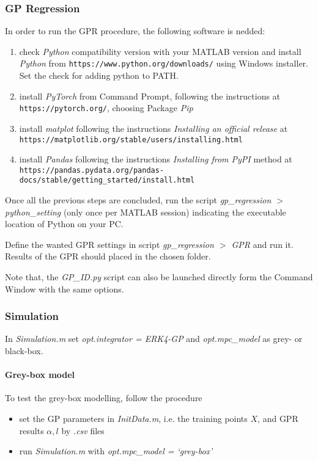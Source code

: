 \documentclass{article}
\begin{document}
\subsubsection{GP Regression}

In order to run the GPR procedure, the following software is nedded:
\begin{enumerate}
    \item check \textit{Python} compatibility version with your MATLAB version and install \textit{Python} from \texttt{https://www.python.org/downloads/} using Windows installer. Set the check for adding python to PATH.%
    \item install \textit{PyTorch} from Command Prompt, following the instructions at \texttt{https://pytorch.org/}, choosing Package \textit{Pip}
    \item install \textit{matplot} following the instructions \textit{Installing an official release} at\\ \texttt{https://matplotlib.org/stable/users/installing.html}
    \item install \textit{Pandas} following the instructions \textit{Installing from PyPI} method at\\ \texttt{https://pandas.pydata.org/pandas-docs/stable/getting\_started/install.html}
\end{enumerate}

Once all the previous steps are concluded, run the script \textit{gp\_regression $>$ python\_setting} (only once per MATLAB session) indicating the executable location of Python on your PC.

Define the wanted GPR settings in script \textit{gp\_regression $>$ GPR} and run it. Results of the GPR should placed in the chosen folder. 

Note that, the \textit{GP\_ID.py} script can also be launched directly form the Command Window with the same options.

\subsubsection{Simulation}

In \textit{Simulation.m} set \textit{opt.integrator = ERK4-GP} and \textit{opt.mpc\_model} as grey- or black-box.

\paragraph{Grey-box model}
To test the grey-box modelling, follow the procedure
\begin{itemize}
    \item set the GP parameters in \textit{InitData.m}, i.e. the training points $X$, and GPR results $\alpha, l$ by \textit{.csv} files
    \item run \textit{Simulation.m} with \textit{opt.mpc\_model = `grey-box'}
\end{itemize}
\end{document}
